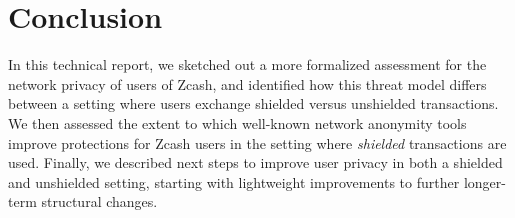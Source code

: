 \documentclass{article}
\begin{document}
\section{Conclusion}
\label{conclusion}

In this technical report, we sketched out a more formalized assessment for the
network privacy of
users of Zcash, and identified how this threat model differs between a setting
where users exchange shielded versus unshielded transactions. We then assessed
the extent to which well-known network anonymity tools improve protections for
Zcash users in the setting where \emph{shielded} transactions are used.
Finally, we described next steps to improve user privacy in both a shielded and
unshielded setting, starting with lightweight improvements to further
longer-term structural changes.



\end{document}
